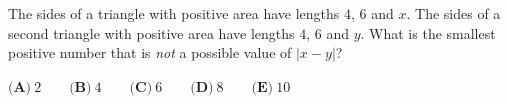 The sides of a triangle with positive area have lengths $4$, $6$ and $x$. The sides of a second triangle with positive area have lengths $4$, $6$ and $y$. What is the smallest positive number that is \emph{not} a possible value of $|x-y|$?

$\textbf{(A)}\ 2\qquad\textbf{(B)}\ 4\qquad\textbf{(C)}\ 6\qquad\textbf{(D)}\ 8\qquad\textbf{(E)}\ 10$
